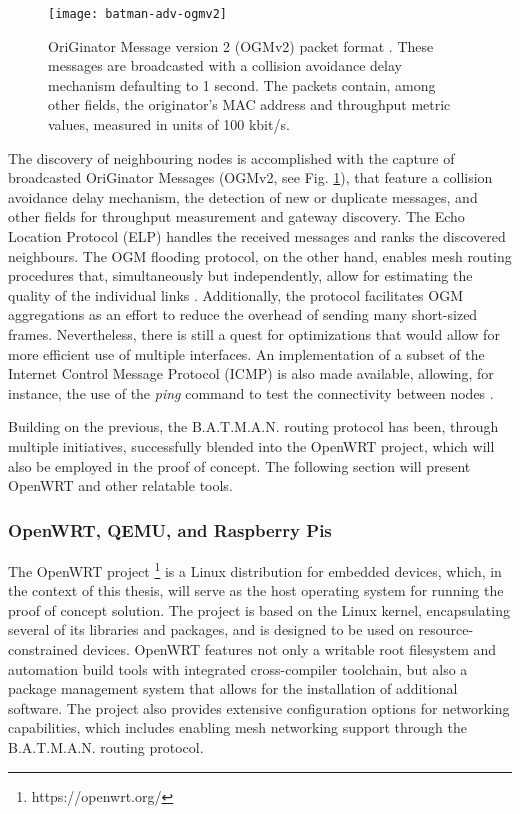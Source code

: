 \begin{figure} [ht]
  \begin{center}
  \texttt{[image: batman-adv-ogmv2]}
  \caption{OriGinator Message version 2 (OGMv2) packet format \cite{cilfone2019wireless,open-mesh-ogmv2}. These messages are broadcasted with a collision avoidance delay mechanism defaulting to 1 second. The packets contain, among other fields, the originator's MAC address and throughput metric values, measured in units of 100 kbit/s.}
  \label{fig:batman-adv-ogmv2}
  \end{center}
\end{figure}

The discovery of neighbouring nodes is accomplished with the capture of broadcasted OriGinator Messages (OGMv2, see Fig. \ref{fig:batman-adv-ogmv2}), that feature a collision avoidance delay mechanism, the detection of new or duplicate messages, and other fields for throughput measurement and gateway discovery. The Echo Location Protocol (ELP) handles the received messages and ranks the discovered neighbours. The OGM flooding protocol, on the other hand, enables mesh routing procedures that, simultaneously but independently, allow for estimating the quality of the individual links \cite{cilfone2019wireless}. Additionally, the protocol facilitates OGM aggregations as an effort to reduce the overhead of sending many short-sized frames. Nevertheless, there is still a quest for optimizations that would allow for more efficient use of multiple interfaces. An implementation of a subset of the Internet Control Message Protocol (ICMP) is also made available, allowing, for instance, the use of the \emph{ping} command to test the connectivity between nodes \cite{seither2011routing}.

Building on the previous, the B.A.T.M.A.N. routing protocol has been, through multiple initiatives, successfully blended into the OpenWRT project, which will also be employed in the proof of concept. The following section will present OpenWRT and other relatable tools.

\subsubsection{OpenWRT, QEMU, and Raspberry Pis}

The OpenWRT project \footnote{https://openwrt.org/} is a Linux distribution for embedded devices, which, in the context of this thesis, will serve as the host operating system for running the proof of concept solution. The project is based on the Linux kernel, encapsulating several of its libraries and packages, and is designed to be used on resource-constrained devices. OpenWRT features not only a writable root filesystem and automation build tools with integrated cross-compiler toolchain, but also a package management system that allows for the installation of additional software. The project also provides extensive configuration options for networking capabilities, which includes enabling mesh networking support through the B.A.T.M.A.N. routing protocol. 

